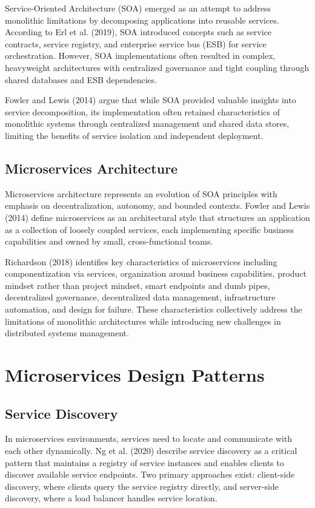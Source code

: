 Service-Oriented Architecture (SOA) emerged as an attempt to address monolithic limitations by decomposing applications into reusable services. According to Erl et al. (2019), SOA introduced concepts such as service contracts, service registry, and enterprise service bus (ESB) for service orchestration. However, SOA implementations often resulted in complex, heavyweight architectures with centralized governance and tight coupling through shared databases and ESB dependencies.

Fowler and Lewis (2014) argue that while SOA provided valuable insights into service decomposition, its implementation often retained characteristics of monolithic systems through centralized management and shared data stores, limiting the benefits of service isolation and independent deployment.

\subsection{Microservices Architecture}

Microservices architecture represents an evolution of SOA principles with emphasis on decentralization, autonomy, and bounded contexts. Fowler and Lewis (2014) define microservices as an architectural style that structures an application as a collection of loosely coupled services, each implementing specific business capabilities and owned by small, cross-functional teams.

Richardson (2018) identifies key characteristics of microservices including componentization via services, organization around business capabilities, product mindset rather than project mindset, smart endpoints and dumb pipes, decentralized governance, decentralized data management, infrastructure automation, and design for failure. These characteristics collectively address the limitations of monolithic architectures while introducing new challenges in distributed systems management.

\section{Microservices Design Patterns}

\subsection{Service Discovery}

In microservices environments, services need to locate and communicate with each other dynamically. Ng et al. (2020) describe service discovery as a critical pattern that maintains a registry of service instances and enables clients to discover available service endpoints. Two primary approaches exist: client-side discovery, where clients query the service registry directly, and server-side discovery, where a load balancer handles service location.

